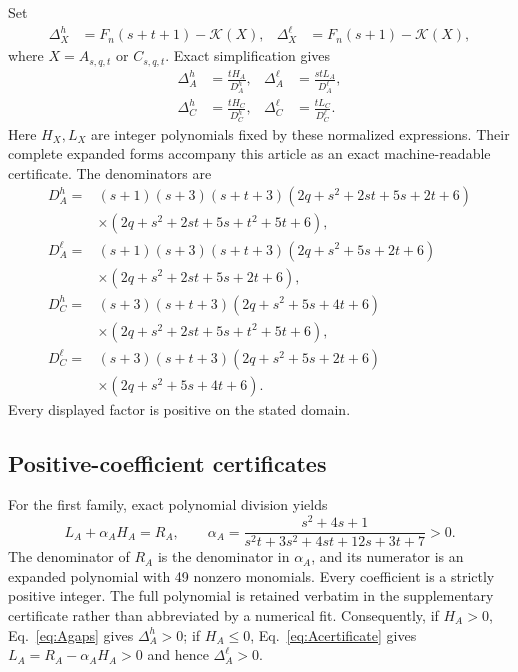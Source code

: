 \documentclass[11pt]{article}
\newcommand{\K}{\mathcal{K}}
\begin{document}
Set
\begin{align}
 \Delta_X^h&=F_n(s+t+1)-\K(X),&
 \Delta_X^\ell&=F_n(s+1)-\K(X),
\end{align}
where $X=A_{s,q,t}$ or $C_{s,q,t}$.  Exact simplification gives
\begin{align}
 \Delta_A^h&=\frac{tH_A}{D_A^h}, &
 \Delta_A^\ell&=\frac{stL_A}{D_A^\ell},\label{eq:Agaps}\\
 \Delta_C^h&=\frac{tH_C}{D_C^h}, &
 \Delta_C^\ell&=\frac{tL_C}{D_C^\ell}.\label{eq:Cgaps}
\end{align}
Here $H_X,L_X$ are integer polynomials fixed by these normalized expressions.
Their complete expanded forms accompany this article as an exact
machine-readable certificate.  The denominators are
\begin{align*}
D_A^h={}&(s+1)(s+3)(s+t+3)
 (2q+s^2+2st+5s+2t+6)\\
&\times(2q+s^2+2st+5s+t^2+5t+6),\\
D_A^\ell={}&(s+1)(s+3)(s+t+3)
 (2q+s^2+5s+2t+6)\\
&\times(2q+s^2+2st+5s+2t+6),\\
D_C^h={}&(s+3)(s+t+3)(2q+s^2+5s+4t+6)\\
&\times(2q+s^2+2st+5s+t^2+5t+6),\\
D_C^\ell={}&(s+3)(s+t+3)(2q+s^2+5s+2t+6)\\
&\times(2q+s^2+5s+4t+6).
\end{align*}
Every displayed factor is positive on the stated domain.

\subsection{Positive-coefficient certificates}

For the first family, exact polynomial division yields
\begin{equation}
 L_A+\alpha_AH_A=R_A,
 \qquad
 \alpha_A=\frac{s^2+4s+1}{s^2t+3s^2+4st+12s+3t+7}>0.
 \label{eq:Acertificate}
\end{equation}
The denominator of $R_A$ is the denominator in $\alpha_A$, and its numerator
is an expanded polynomial with 49 nonzero monomials.  Every coefficient is a
strictly positive integer.  The full polynomial is retained verbatim in the
supplementary certificate rather than abbreviated by a numerical fit.
Consequently, if $H_A>0$, Eq.~\eqref{eq:Agaps} gives $\Delta_A^h>0$; if
$H_A\leq0$, Eq.~\eqref{eq:Acertificate} gives
$L_A=R_A-\alpha_AH_A>0$ and hence $\Delta_A^\ell>0$.
\end{document}
